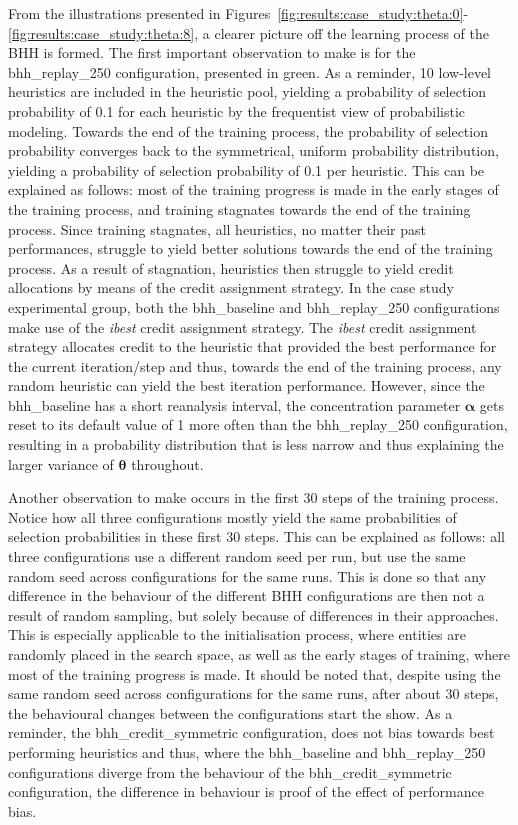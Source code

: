 From the illustrations presented in Figures~\ref{fig:results:case_study:theta:0}-\ref{fig:results:case_study:theta:8}, a clearer picture off the learning process of the \acs{BHH} is formed. The first important observation to make is for the bhh\_replay\_250 configuration, presented in green. As a reminder, 10 low-level heuristics are included in the heuristic pool, yielding a probability of selection probability of 0.1 for each heuristic by the frequentist view of probabilistic modeling. Towards the end of the training process, the probability of selection probability converges back to the symmetrical, uniform probability distribution, yielding a probability of selection probability of 0.1 per heuristic. This can be explained as follows: most of the training progress is made in the early stages of the training process, and training stagnates towards the end of the training process. Since training stagnates, all heuristics, no matter their past performances, struggle to yield better solutions towards the end of the training process. As a result of stagnation, heuristics then struggle to yield credit allocations by means of the credit assignment strategy. In the case study experimental group, both the bhh\_baseline and bhh\_replay\_250 configurations make use of the \textit{ibest} credit assignment strategy. The \textit{ibest} credit assignment strategy allocates credit to the heuristic that provided the best performance for the current iteration/step and thus, towards the end of the training process, any random heuristic can yield the best iteration performance. However, since the bhh\_baseline has a short reanalysis interval, the concentration parameter $\boldsymbol{\alpha}$ gets reset to its default value of 1 more often than the bhh\_replay\_250 configuration, resulting in a probability distribution that is less narrow and thus explaining the larger variance of $\boldsymbol{\theta}$ throughout.

Another observation to make occurs in the first 30 steps of the training process. Notice how all three configurations mostly yield the same probabilities of selection probabilities in these first 30 steps. This can be explained as follows: all three configurations use a different random seed per run, but use the same random seed across configurations for the same runs. This is done so that any difference in the behaviour of the different \acs{BHH} configurations are then not a result of random sampling, but solely because of differences in their approaches. This is especially applicable to the initialisation process, where entities are randomly placed in the search space, as well as the early stages of training, where most of the training progress is made. It should be noted that, despite using the same random seed across configurations for the same runs, after about 30 steps, the behavioural changes between the configurations start the show. As a reminder, the bhh\_credit\_symmetric configuration, does not bias towards best performing heuristics and thus, where the bhh\_baseline and bhh\_replay\_250 configurations diverge from the behaviour of the bhh\_credit\_symmetric configuration, the difference in behaviour is proof of the effect of performance bias.

